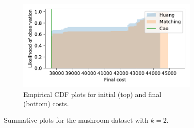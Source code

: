 \documentclass[smallextended]{svjour3}
\begin{document}
\begin{figure}
\begin{subfigure}{.5\textwidth}
        \includegraphics[width=\linewidth]{Fig6b2.pdf}
        \caption{Empirical CDF plots for initial (top) and final (bottom)
                 costs.}
    \end{subfigure}
    \caption{Summative plots for the mushroom dataset with \(k=2\).}%
    \label{fig:mushroom_nclasses}
\end{figure}
\end{document}
